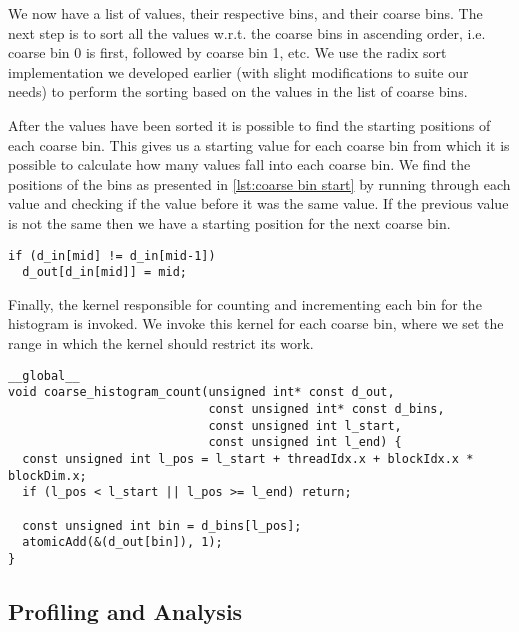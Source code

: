 We now have a list of values, their respective bins, and their coarse bins.
The next step is to sort all the values w.r.t. the coarse bins in ascending order, i.e. coarse bin 0 is first, followed by coarse bin 1, etc.
We use the radix sort implementation we developed earlier (with slight modifications to suite our needs) to perform the sorting based on the values in the list of coarse bins.

After the values have been sorted it is possible to find the starting positions of each coarse bin.
This gives us a starting value for each coarse bin from which it is possible to calculate how many values fall into each coarse bin.
We find the positions of the bins as presented in \cref{lst:coarse bin start} by running through each value and checking if the value before it was the same value.
If the previous value is not the same then we have a starting position for the next coarse bin.

\begin{lstlisting}[caption={find the start positions of each coarse bin}, label={lst:coarse bin start}, numbers=none]
if (d_in[mid] != d_in[mid-1])
  d_out[d_in[mid]] = mid;
\end{lstlisting}

Finally, the kernel responsible for counting and incrementing each bin for the histogram is invoked.
We invoke this kernel for each coarse bin, where we set the range in which the kernel should restrict its work.


\begin{lstlisting}[caption={kernel to do histogram count for each coarse bin}, label={lst:coarse histo kernel}]
__global__
void coarse_histogram_count(unsigned int* const d_out,
                            const unsigned int* const d_bins,
                            const unsigned int l_start,
                            const unsigned int l_end) {
  const unsigned int l_pos = l_start + threadIdx.x + blockIdx.x * blockDim.x;
  if (l_pos < l_start || l_pos >= l_end) return;

  const unsigned int bin = d_bins[l_pos];
  atomicAdd(&(d_out[bin]), 1);
}
\end{lstlisting}


\subsection{Profiling and Analysis}

